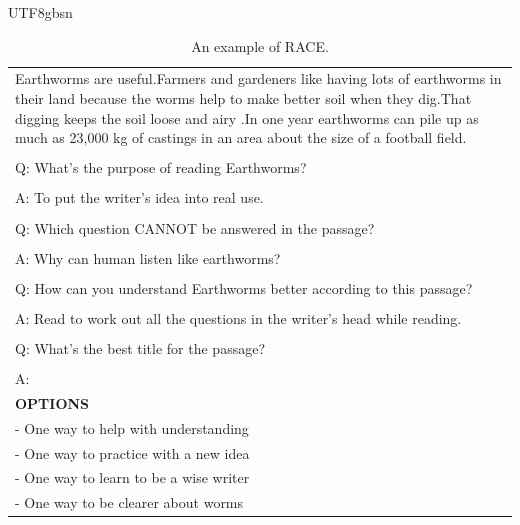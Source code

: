 \documentclass[11pt, a4paper, logo, copyright, nonumbering]{deepseek}
\begin{document}
\begin{CJK*}{UTF8}{gbsn}
\begin{table}[ht]
\begin{tabular}{p{12cm}}
Earthworms are useful.Farmers and gardeners like having lots of earthworms in their land because the worms help to make better soil when they dig.That digging keeps the soil loose and airy .In one year earthworms can pile up as much as 23,000 kg of castings in an area about the size of a football field.\\
\\
Q: What's the purpose of reading Earthworms?\\
\\
A: To put the writer's idea into real use.\\
\\
Q: Which question CANNOT be answered in the passage?\\
\\
A: Why can human listen like earthworms?\\
\\
Q: How can you understand Earthworms better according to this passage?\\
\\
A: Read to work out all the questions in the writer's head while reading.\\
\\
Q: What's the best title for the passage?\\
\\
A:\\
\midrule
\textbf{OPTIONS}\\
- One way to help with understanding\\
- One way to practice with a new idea\\
- One way to learn to be a wise writer\\
- One way to be clearer about worms\\
\bottomrule
\end{tabular}
    \caption{\centering An example of RACE.}
    \label{tab:race_eval_format_example}
\end{table}


\end{CJK*}
\end{document}
